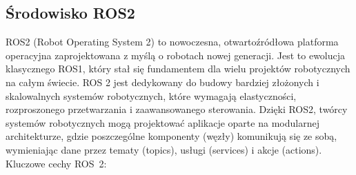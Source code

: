 \documentclass[12pt]{article}
\begin{document}
\subsection{Środowisko ROS2}

ROS2 (Robot Operating System 2) to nowoczesna, otwartoźródłowa platforma operacyjna zaprojektowana z myślą o robotach nowej generacji. Jest to ewolucja klasycznego ROS1, który stał się fundamentem dla wielu projektów robotycznych na całym świecie. ROS 2 jest dedykowany do budowy bardziej złożonych i~ skalowalnych systemów robotycznych, które wymagają elastyczności, rozproszonego przetwarzania i zaawansowanego sterowania. Dzięki ROS2, twórcy systemów robotycznych mogą projektować aplikacje oparte na modularnej architekturze, gdzie poszczególne komponenty (węzły) komunikują się ze sobą, wymieniając dane przez tematy (topics), usługi (services) i akcje (actions).\\

\noindent Kluczowe cechy ROS~2:
\end{document}
